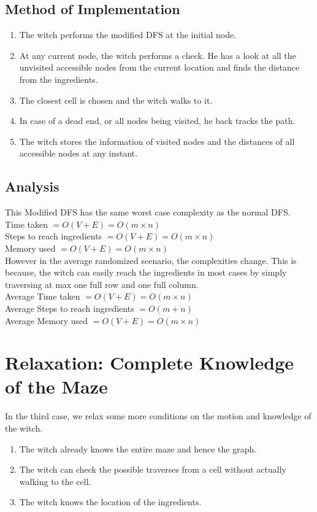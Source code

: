 \documentclass{article} %
\begin{document}
\subsection{Method of Implementation}
\begin{enumerate}
    \item The witch performs the modified DFS at the initial node.
    \item At any current node, the witch performs a check. He has a look at all the unvisited accessible nodes from the current location and finds the distance from the ingredients.
    \item The closest cell is chosen and the witch walks to it.
    \item In case of a dead end, or all nodes being visited, he back tracks the path.
    \item The witch stores the information of visited nodes and the distances of all accessible nodes at any instant.
\end{enumerate}
\subsection{Analysis}
This Modified DFS has the same worst case complexity as the normal DFS.
\\Time taken $= O(V+E) = O(m \times n)$
\\Steps to reach ingredients $= O(V+E) = O(m \times n)$
\\Memory used $= O(V+E) = O(m \times n)$
\vspace{10 pt}
\\However in the average randomized scenario, the complexities change. This is because, the witch can easily reach the ingredients in most cases by simply traversing at max one full row and one full column.
\\Average Time taken $= O(V+E) = O(m \times n)$
\\Average Steps to reach ingredients $= O(m+n)$
\\Average Memory used $= O(V+E) = O(m \times n)$

\section{Relaxation: Complete Knowledge of the Maze}
In the third case, we relax some more conditions on the motion and knowledge of the witch.
\begin{enumerate}
    \item The witch already knows the entire maze and hence the graph.
    \item The witch can check the possible traverses from a cell without actually walking to the cell.
    \item The witch knows the location of the ingredients.
\end{enumerate}
\end{document}
